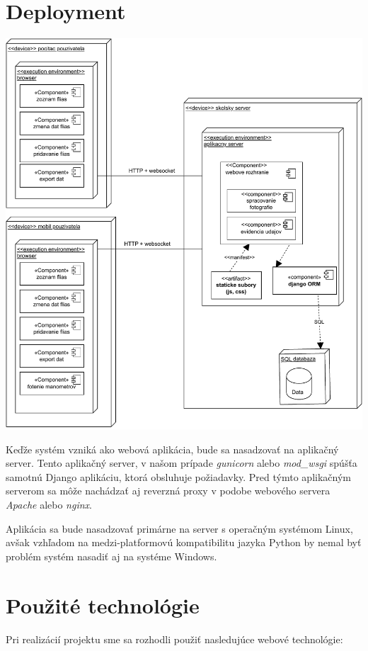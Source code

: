 \documentclass{zah}
\begin{document}
\section{Deployment}
\includegraphics[width=\textwidth]{navrh-assets/deployment}

Keďže systém vzniká ako webová aplikácia, bude sa nasadzovať na aplikačný server.
Tento aplikačný server, v našom prípade \textit{gunicorn} alebo \textit{mod\_wsgi} spúšťa samotnú
Django aplikáciu, ktorá obsluhuje požiadavky. Pred týmto aplikačným serverom sa môže nachádzať aj
reverzná proxy v podobe webového servera \textit{Apache} alebo \textit{nginx}.

Aplikácia sa bude nasadzovať primárne na server s operačným systémom Linux, avšak vzhľadom na
medzi-platformovú kompatibilitu jazyka Python by nemal byť problém systém nasadiť aj na systéme Windows.

\section{Použité technológie}

Pri realizácií projektu sme sa rozhodli použiť nasledujúce webové technológie:
\end{document}
